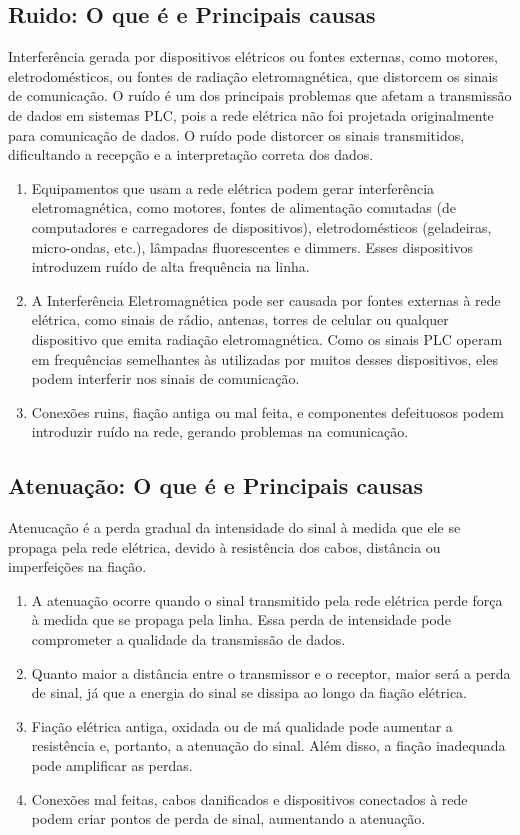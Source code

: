 \documentclass[12pt]{article}
\begin{document}
\subsection{Ruido: O que é e Principais causas}
Interferência gerada por dispositivos elétricos ou fontes externas, como motores, eletrodomésticos, ou fontes de radiação eletromagnética, que distorcem os sinais de comunicação. O ruído é um dos principais problemas que afetam a transmissão de dados em sistemas PLC, pois a rede elétrica não foi projetada originalmente para comunicação de dados. O ruído pode distorcer os sinais transmitidos, dificultando a recepção e a interpretação correta dos dados.
\begin{enumerate}
\item Equipamentos que usam a rede elétrica podem gerar interferência eletromagnética, como motores, fontes de alimentação comutadas (de computadores e carregadores de dispositivos), eletrodomésticos (geladeiras, micro-ondas, etc.), lâmpadas fluorescentes e dimmers. Esses dispositivos introduzem ruído de alta frequência na linha.

\item A Interferência Eletromagnética pode ser causada por fontes externas à rede elétrica, como sinais de rádio, antenas, torres de celular ou qualquer dispositivo que emita radiação eletromagnética. Como os sinais PLC operam em frequências semelhantes às utilizadas por muitos desses dispositivos, eles podem interferir nos sinais de comunicação.
\item Conexões ruins, fiação antiga ou mal feita, e componentes defeituosos podem introduzir ruído na rede, gerando problemas na comunicação.
\end{enumerate}

\subsection{Atenuação: O que é e Principais causas}
Atenucação é a perda gradual da intensidade do sinal à medida que ele se propaga pela rede elétrica, devido à resistência dos cabos, distância ou imperfeições na fiação.

\begin{enumerate}
\item A atenuação ocorre quando o sinal transmitido pela rede elétrica perde força à medida que se propaga pela linha. Essa perda de intensidade pode comprometer a qualidade da transmissão de dados.
\item Quanto maior a distância entre o transmissor e o receptor, maior será a perda de sinal, já que a energia do sinal se dissipa ao longo da fiação elétrica.
\item Fiação elétrica antiga, oxidada ou de má qualidade pode aumentar a resistência e, portanto, a atenuação do sinal. Além disso, a fiação inadequada pode amplificar as perdas.
\item Conexões mal feitas, cabos danificados e dispositivos conectados à rede podem criar pontos de perda de sinal, aumentando a atenuação.
\end{enumerate}
\end{document}
